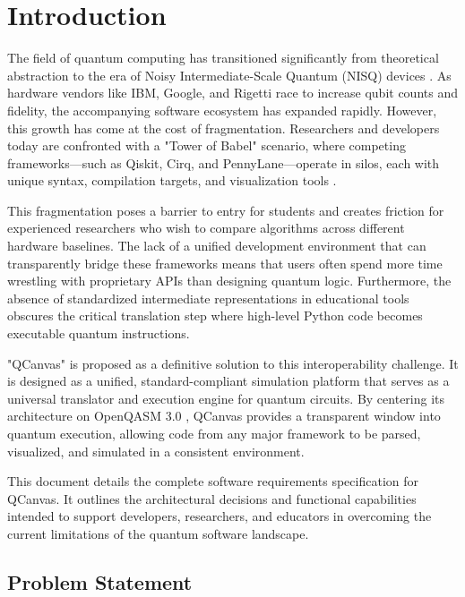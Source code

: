 \chapter{Introduction}

The field of quantum computing has transitioned significantly from theoretical abstraction to the era of Noisy Intermediate-Scale Quantum (NISQ) devices \cite{preskill2018quantum, nielsen2010quantum}. As hardware vendors like IBM, Google, and Rigetti race to increase qubit counts and fidelity, the accompanying software ecosystem has expanded rapidly. However, this growth has come at the cost of fragmentation. Researchers and developers today are confronted with a "Tower of Babel" scenario, where competing frameworks—such as Qiskit, Cirq, and PennyLane—operate in silos, each with unique syntax, compilation targets, and visualization tools \cite{qiskit, cirq_developers_2023, bergholm2018pennylane}.

This fragmentation poses a barrier to entry for students and creates friction for experienced researchers who wish to compare algorithms across different hardware baselines. The lack of a unified development environment that can transparently bridge these frameworks means that users often spend more time wrestling with proprietary APIs than designing quantum logic. Furthermore, the absence of standardized intermediate representations in educational tools obscures the critical translation step where high-level Python code becomes executable quantum instructions.

"QCanvas" is proposed as a definitive solution to this interoperability challenge. It is designed as a unified, standard-compliant simulation platform that serves as a universal translator and execution engine for quantum circuits. By centering its architecture on OpenQASM 3.0 \cite{cross2021openqasm, cross2017openqasm}, QCanvas provides a transparent window into quantum execution, allowing code from any major framework to be parsed, visualized, and simulated in a consistent environment.

This document details the complete software requirements specification for QCanvas. It outlines the architectural decisions and functional capabilities intended to support developers, researchers, and educators in overcoming the current limitations of the quantum software landscape.

\section{Problem Statement}

